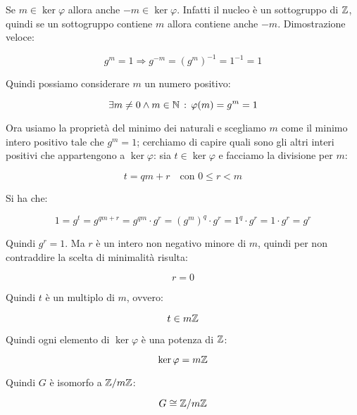 \begin{dimostrazione}
	Se $m \in \ker \varphi$ allora anche $-m \in \ker \varphi$. Infatti il nucleo è un sottogruppo di $\mathbb{Z}$, quindi se un sottogruppo contiene $m$ allora contiene anche $-m$.  Dimostrazione veloce:
	
	\begin{equation}
		g^m = 1 \Longrightarrow g^{-m} = (g^m)^{-1} = 1^{-1} = 1
	\end{equation}

	Quindi possiamo considerare $m$ un numero positivo:

	\begin{equation}
		\exists m \ne 0 \land m \in \mathbb{N} \,:\, \varphi(m) = g^m = 1
	\end{equation}

	Ora usiamo la proprietà del minimo dei naturali e scegliamo $m$ come il minimo intero positivo tale che $g^m = 1$; cerchiamo di capire quali sono gli altri interi positivi che appartengono a $\ker \varphi$: sia $t \in \ker \varphi$ e facciamo la divisione per $m$:
	
	\begin{equation}
		t = qm + r \quad \text{con } 0 \le r < m
	\end{equation}

	Si ha che:
	
	\begin{equation}
		1 = g^t = g^{qm + r} = g^{qm} \cdot g^r = (g^m)^q \cdot g^r = 1^q \cdot g^r = 1 \cdot g^r = g^r
	\end{equation}

	Quindi $g^r = 1$. Ma $r$ è un intero non negativo minore di $m$, quindi per non contraddire la scelta di minimalità risulta:
	
	\begin{equation}
		r = 0
	\end{equation}

	Quindi $t$ è un multiplo di $m$, ovvero:
	
	\begin{equation}
		t \in m\mathbb{Z}
	\end{equation}

	Quindi ogni elemento di $\ker \varphi$ è una potenza di $\mathbb{Z}$:
	
	\begin{equation}
		\ker \varphi = m\mathbb{Z}
	\end{equation}

	Quindi $G$ è isomorfo a $\mathbb{Z}/m\mathbb{Z}$:
	
	\begin{equation}
		G \cong \mathbb{Z}/m\mathbb{Z}
	\end{equation}

\end{dimostrazione}

